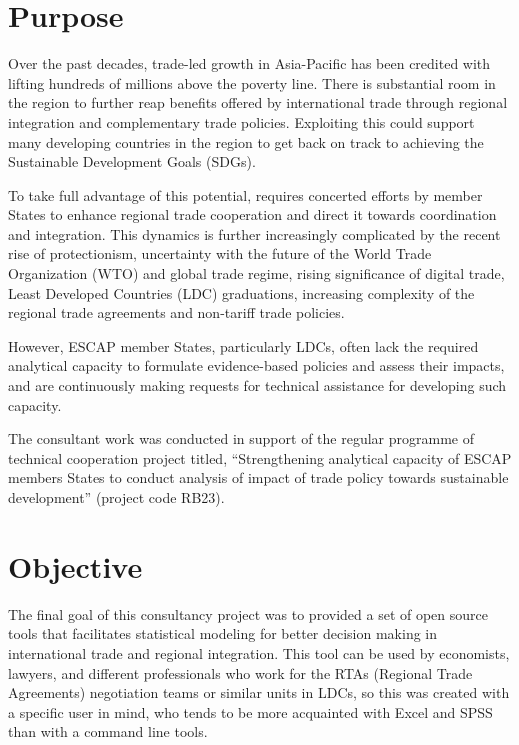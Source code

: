 \documentclass[12pt,reqno,oneside,pdftex]{formato-puc/puctesis} %
\begin{document}
\hypertarget{purpose}{%
\section{Purpose}\label{purpose}}

Over the past decades, trade-led growth in Asia-Pacific has been
credited with lifting hundreds of millions above the poverty line. There
is substantial room in the region to further reap benefits offered by
international trade through regional integration and complementary trade
policies. Exploiting this could support many developing countries in the
region to get back on track to achieving the Sustainable Development
Goals (SDGs).

To take full advantage of this potential, requires concerted efforts by
member States to enhance regional trade cooperation and direct it
towards coordination and integration. This dynamics is further
increasingly complicated by the recent rise of protectionism,
uncertainty with the future of the World Trade Organization (WTO) and
global trade regime, rising significance of digital trade, Least
Developed Countries (LDC) graduations, increasing complexity of the
regional trade agreements and non-tariff trade policies.

However, ESCAP member States, particularly LDCs, often lack the required
analytical capacity to formulate evidence-based policies and assess
their impacts, and are continuously making requests for technical
assistance for developing such capacity.

The consultant work was conducted in support of the regular programme of
technical cooperation project titled, ``Strengthening analytical
capacity of ESCAP members States to conduct analysis of impact of trade
policy towards sustainable development'' (project code RB23).

\hypertarget{objective}{%
\section{Objective}\label{objective}}

The final goal of this consultancy project was to provided a set of open
source tools that facilitates statistical modeling for better decision
making in international trade and regional integration. This tool can be
used by economists, lawyers, and different professionals who work for
the RTAs (Regional Trade Agreements) negotiation teams or similar units
in LDCs, so this was created with a specific user in mind, who tends to
be more acquainted with Excel and SPSS than with a command line tools.
\end{document}
